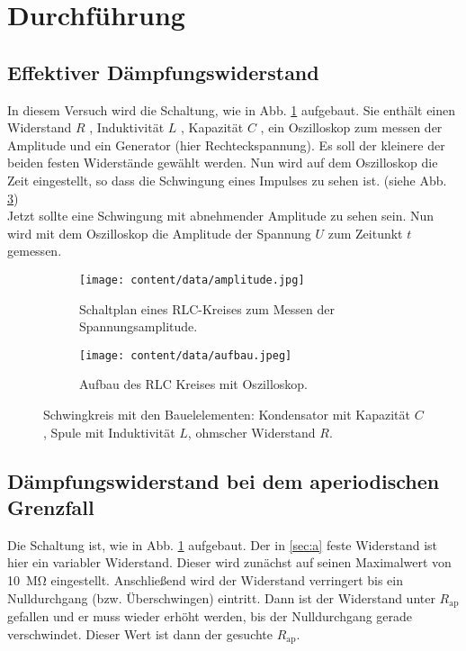 \section{Durchführung}
\label{sec:Durchführung}
\subsection{Effektiver Dämpfungswiderstand}
\label{sec:a}
In diesem Versuch wird die Schaltung, wie in Abb. \ref{fig:schaltung_ampli} aufgebaut.
Sie enthält einen Widerstand $R$ , Induktivität $L$ , Kapazität $C$ , ein Oszilloskop zum messen der Amplitude und ein Generator (hier Rechteckspannung).
Es soll der kleinere der beiden festen Widerstände gewählt werden.
Nun wird auf dem Oszilloskop die Zeit eingestellt, so dass die Schwingung eines Impulses zu sehen ist. (siehe Abb. \ref{fig:aufbau_ampli})\\
Jetzt sollte eine Schwingung mit abnehmender Amplitude zu sehen sein.
Nun wird mit dem Oszilloskop die Amplitude der Spannung $U$ zum Zeitunkt $t$ gemessen.
\begin{figure}
    \centering
    \begin{subfigure}{0.48\textwidth}
        \centering
        \texttt{[image: content/data/amplitude.jpg]}
        \caption{Schaltplan eines RLC-Kreises zum Messen der Spannungsamplitude. \cite[S.294]{anleitung}}
        \label{fig:schaltung_ampli}
    \end{subfigure}
    \begin{subfigure}{0.48\textwidth}
        \centering
        \texttt{[image: content/data/aufbau.jpeg]}
        \caption{Aufbau des RLC Kreises mit Oszilloskop.} 
        \label{fig:aufbau_ampli}
    \end{subfigure}
    \caption{Schwingkreis mit den Bauelelementen: Kondensator mit Kapazität $C$, Spule mit Induktivität $L$, ohmscher Widerstand $R$.}
\end{figure}

\subsection{Dämpfungswiderstand bei dem aperiodischen Grenzfall}
Die Schaltung ist, wie in Abb. \ref{fig:schaltung_ampli} aufgebaut. Der in \autoref{sec:a} feste Widerstand
ist hier ein variabler Widerstand. Dieser wird zunächst auf seinen Maximalwert von \SI{10}{\mega\ohm} eingestellt.
Anschließend wird der Widerstand verringert bis ein Nulldurchgang (bzw. Überschwingen) eintritt.
Dann ist der Widerstand unter $R_\text{ap}$ gefallen und er muss wieder erhöht werden, bis der Nulldurchgang gerade verschwindet.
Dieser Wert ist dann der gesuchte $R_\text{ap}$.

